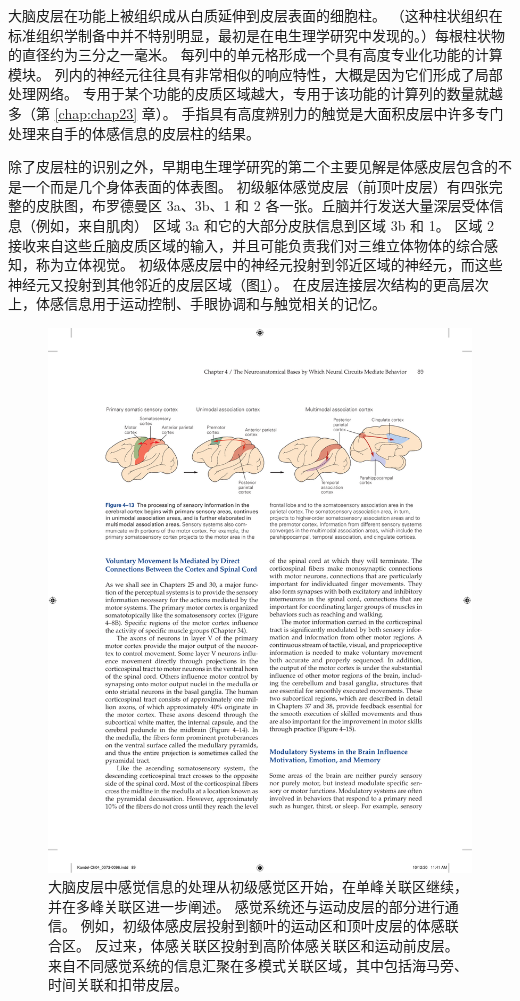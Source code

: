 大脑皮层在功能上被组织成从白质延伸到皮层表面的细胞柱。 
（这种柱状组织在标准组织学制备中并不特别明显，最初是在电生理学研究中发现的。）每根柱状物的直径约为三分之一毫米。 
每列中的单元格形成一个具有高度专业化功能的计算模块。 
列内的神经元往往具有非常相似的响应特性，大概是因为它们形成了局部处理网络。 
专用于某个功能的皮质区域越大，专用于该功能的计算列的数量就越多（第 \ref{chap:chap23} 章）。 
手指具有高度辨别力的触觉是大面积皮层中许多专门处理来自手的体感信息的皮层柱的结果。


除了皮层柱的识别之外，早期电生理学研究的第二个主要见解是体感皮层包含的不是一个而是几个身体表面的体表图。 
初级躯体感觉皮层（前顶叶皮层）有四张完整的皮肤图，布罗德曼区 3a、3b、1 和 2 各一张。丘脑并行发送大量深层受体信息（例如，来自肌肉） 区域 3a 和它的大部分皮肤信息到区域 3b 和 1。
区域 2 接收来自这些丘脑皮质区域的输入，并且可能负责我们对三维立体物体的综合感知，称为立体视觉。 
初级体感皮层中的神经元投射到邻近区域的神经元，而这些神经元又投射到其他邻近的皮层区域（图\ref{fig:4_13}）。 
在皮层连接层次结构的更高层次上，体感信息用于运动控制、手眼协调和与触觉相关的记忆。

\begin{figure}[htbp]
	\centering
	\includegraphics[width=1.0\linewidth]{chap04/fig_4_13}
	\caption{大脑皮层中感觉信息的处理从初级感觉区开始，在单峰关联区继续，并在多峰关联区进一步阐述。 
		感觉系统还与运动皮层的部分进行通信。 例如，初级体感皮层投射到额叶的运动区和顶叶皮层的体感联合区。 
		反过来，体感关联区投射到高阶体感关联区和运动前皮层。 
		来自不同感觉系统的信息汇聚在多模式关联区域，其中包括海马旁、时间关联和扣带皮层。}
	\label{fig:4_13}
\end{figure}


